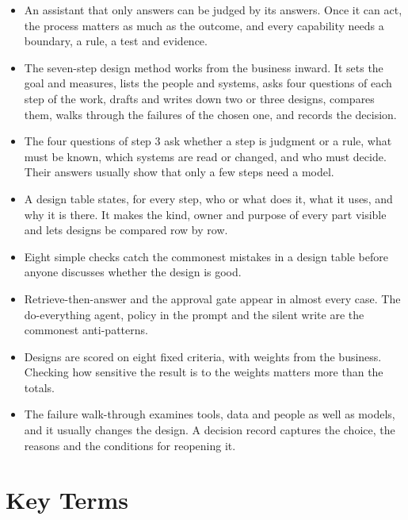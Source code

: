 \begin{itemize}[itemsep=2pt]
  \item An assistant that only answers can be judged by its answers. Once it can act, the process matters as much as the outcome, and every capability needs a boundary, a rule, a test and evidence.
  \item The seven-step design method works from the business inward. It sets the goal and measures, lists the people and systems, asks four questions of each step of the work, drafts and writes down two or three designs, compares them, walks through the failures of the chosen one, and records the decision.
  \item The four questions of step 3 ask whether a step is judgment or a rule, what must be known, which systems are read or changed, and who must decide. Their answers usually show that only a few steps need a model.
  \item A design table states, for every step, who or what does it, what it uses, and why it is there. It makes the kind, owner and purpose of every part visible and lets designs be compared row by row.
  \item Eight simple checks catch the commonest mistakes in a design table before anyone discusses whether the design is good.
  \item Retrieve-then-answer and the approval gate appear in almost every case. The do-everything agent, policy in the prompt and the silent write are the commonest anti-patterns.
  \item Designs are scored on eight fixed criteria, with weights from the business. Checking how sensitive the result is to the weights matters more than the totals.
  \item The failure walk-through examines tools, data and people as well as models, and it usually changes the design. A decision record captures the choice, the reasons and the conditions for reopening it.
\end{itemize}

\section*{Key Terms}


